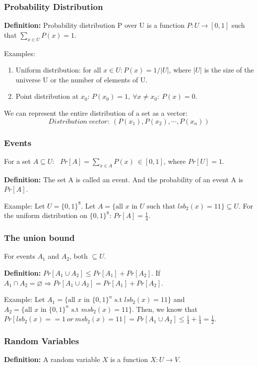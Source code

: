 \documentclass[12pt]{book}
\newcommand{\Def}{\textcolor{dkgreen}{\textbf{Definition:}} }
\begin{document}
\subsubsection{Probability Distribution}
\Def Probability distribution P over U is a function $P: U\rightarrow [0,1]$ such that $\sum\limits_{x\in U}P(x)=1$.

Examples:
\begin{enumerate}
	\item Uniform distribution: for all $x \in U: P(x)=1/|U|$, where $|U|$ is the size of the universe U or the number of elements of U.
	\item Point distribution at $x_{0}$: $P(x_{0}) = 1,\ \forall x\neq x_{0}:\ P(x)=0$.
\end{enumerate}
We can represent the entire distribution of a set as a vector: $$Distribution\ vector:\ \left(P(x_{1}), P(x_{2}), \cdots, P(x_{n})\right)$$

\subsubsection{Events}
For a set $A\subseteq U:\ \ \ Pr[A]=\sum\limits_{x\in A}P(x)\ \in[0,1]$, where $Pr[U]=1$.

\Def The set A is called an event. And the probability of an event A is $Pr[A]$.

Example: Let $U=\{0,1\}^{8}$. Let $A=\{\text{all }x\text{ in }U\text{ such that }lsb_{2}(x)=11\}\subseteq U$. For the uniform distribution on $\{0,1\}^{8}$: $Pr[A]=\frac{1}{4}$.

\subsubsection{The union bound}
For events $A_{1}$ and $A_{2}$, both $\subseteq U$.

\Def $Pr[A_{1}\cup A_{2}]\leq Pr[A_{1}]+Pr[A_{2}]$. If $A_{1}\cap A_{2}=\varnothing\Rightarrow Pr[A_{1}\cup A_{2}]=Pr[A_{1}]+Pr[A_{2}]$.

Example: Let $A_{1}=\{\text{all }x\text{ in }\{0,1\}^{n}\text{ s.t }lsb_{2}(x)=11\}$ and $A_{2}=\{\text{all }x\text{ in }\{0,1\}^{n}\text{ s.t }msb_{2}(x)=11\}$. Then, we know that $Pr[lsb_{2}(x)==1\ or\ msb_{2}(x)=11]=Pr[A_{1}\cup A_{2}]\leq \frac{1}{4}+\frac{1}{4}=\frac{1}{2}$.

\subsubsection{Random Variables}
\Def A random variable $X$ is a function $X:U \rightarrow V$.
\end{document}
